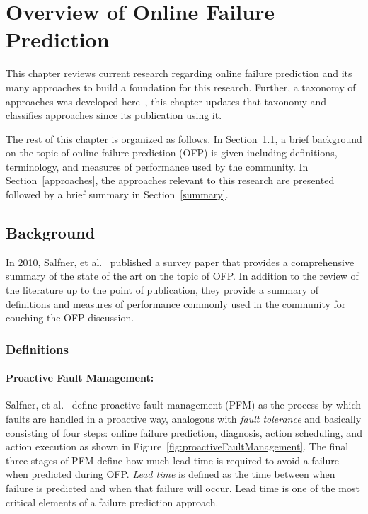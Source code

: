 \chapter{Overview of Online Failure Prediction} \label{chapter2}
This chapter reviews current research regarding online failure prediction and
its many approaches to build a foundation for this research.  Further, a
taxonomy of approaches was developed here~\cite{salfnerSurvey}, this chapter
updates that taxonomy and classifies approaches since its publication using it.

The rest of this chapter is organized as follows.  In Section~\ref{background},
a brief background on the topic of online failure prediction (OFP) is given
including definitions, terminology, and measures of performance used by the
community.  In Section~\ref{approaches}, the approaches relevant to this
research are presented followed by a brief summary in Section~\ref{summary}.

\section{Background} \label{background}
In 2010, Salfner, et al.~\cite{salfnerSurvey} published a survey paper that
provides a comprehensive summary of the state of the art on the topic of OFP.
In addition to the review of the literature up to the point of publication,
they provide a summary of definitions and measures of performance commonly used
in the community for couching the OFP discussion.

\subsection{Definitions} \label{definitions}
\subsubsection{Proactive Fault Management:} \label{pfm}
Salfner, et al.~\cite{salfnerSurvey} define proactive fault management (PFM) as
the process by which faults are handled in a proactive way, analogous with
\emph{fault tolerance} and basically consisting of four steps: online failure
prediction, diagnosis, action scheduling, and action execution as shown in
Figure~\ref{fig:proactiveFaultManagement}.
The final three stages of PFM define how much lead time is required to avoid a
failure when predicted during OFP.  \emph{Lead time} is defined as the time
between when failure is predicted and when that failure will occur.  Lead time
is one of the most critical elements of a failure prediction approach.

